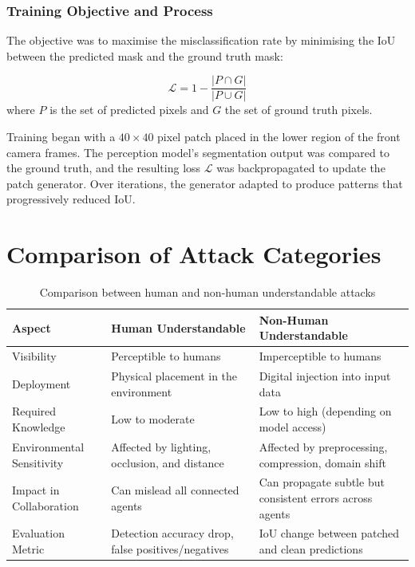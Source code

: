 \subsubsection{Training Objective and Process}

The objective was to maximise the misclassification rate by minimising the IoU between the predicted mask and the ground truth mask:

\[
    \mathcal{L} = 1 - \frac{|P \cap G|}{|P \cup G|}
\]
where \(P\) is the set of predicted pixels and \(G\) the set of ground truth pixels.

Training began with a \(40 \times 40\) pixel patch placed in the lower region of the front camera frames.
The perception model’s segmentation output was compared to the ground truth, and the resulting loss \(\mathcal{L}\) was backpropagated to update the patch generator.
Over iterations, the generator adapted to produce patterns that progressively reduced IoU.

\section{Comparison of Attack Categories}

\begin{table}[h!]
    \centering
    \caption{Comparison between human and non-human understandable attacks}
    \begin{tabular}{p{3cm}p{5cm}p{5cm}}
        \toprule
        \textbf{Aspect}           & \textbf{Human Understandable}                      & \textbf{Non-Human Understandable}                        \\
        \midrule
        Visibility                & Perceptible to humans                              & Imperceptible to humans                                  \\
        Deployment                & Physical placement in the environment              & Digital injection into input data                        \\
        Required Knowledge        & Low to moderate                                    & Low to high (depending on model access)                  \\
        Environmental Sensitivity & Affected by lighting, occlusion, and distance      & Affected by preprocessing, compression, domain shift     \\
        Impact in Collaboration   & Can mislead all connected agents                   & Can propagate subtle but consistent errors across agents \\
        Evaluation Metric         & Detection accuracy drop, false positives/negatives & IoU change between patched and clean predictions         \\
        \bottomrule
    \end{tabular}
\end{table}